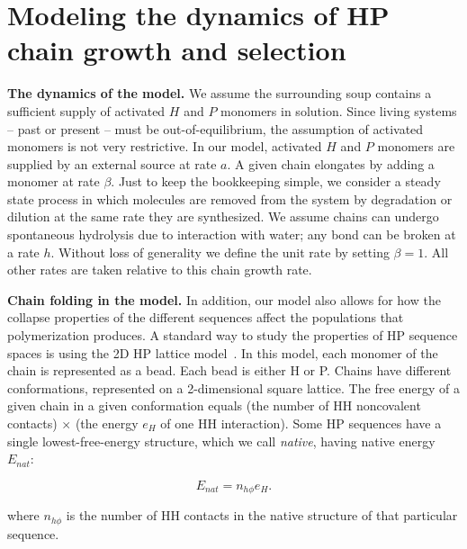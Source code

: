 \documentclass[5p,times]{elsarticle}
\begin{document}
\section{Modeling the dynamics of HP chain growth and selection}
 
 \textbf{The dynamics of the model.}  We assume the surrounding soup contains a sufficient supply of 
activated $H$ and $P$ 
monomers in solution.  Since living systems -- past or present -- must be out-of-equilibrium, the 
assumption of activated monomers is not very restrictive.  In our model, activated $H$ and $P$ 
monomers are supplied by an external source at rate $a$.  A given chain elongates by adding a 
monomer at rate $\beta$.  Just to keep the bookkeeping simple, we consider a steady state process 
in which molecules are removed from the system by degradation or dilution at the same rate they are 
synthesized.  We assume chains can undergo spontaneous hydrolysis due to interaction with water; 
any bond can be broken at a rate $h$. Without loss of generality we define the unit rate by setting 
$\beta = 1$.  All other rates are taken relative to this chain growth rate.
 
 \textbf{Chain folding in the model.}  In addition, our model also allows for how the collapse 
properties of the different sequences affect the populations that polymerization produces.  A 
standard way to study the properties of HP sequence spaces is using the 2D HP lattice 
model~\cite{lau1989lattice,Chan1991}.  In this model, each monomer of the chain is represented as a 
bead.  Each bead is either H or P.  Chains have different conformations, represented on a 
2-dimensional square lattice.  The free energy of a given chain in a given conformation equals (the 
number of HH noncovalent contacts) $\times$ (the energy $e_H$ of one HH interaction).  Some HP 
sequences have a single lowest-free-energy structure, which we call \emph{native}, having native 
energy $E_{nat}$:

\begin{equation}
 E_{nat}=n_{h\phi}e_H.
\end{equation} 

 where $n_{h\phi}$ is the number of HH contacts in the native structure of that particular 
sequence.  
 
\end{document}
